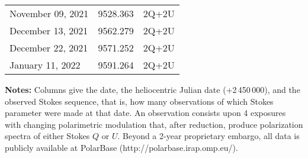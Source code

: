 \documentclass{/Users/art2/TeX/aanda/aa}
\begin{document}
\begin{appendix}
\begin{table} [t]
\begin{tabular}{lcl}
November 09, 2021 & 9528.363 & 2Q+2U \\

December 13, 2021 & 9562.279 & 2Q+2U \\

December 22, 2021 & 9571.252 & 2Q+2U \\

January 11, 2022 & 9591.264 & 2Q+2U \\
\hline
\end{tabular}
\label{tab1}

\textbf{Notes:} Columns give the date, the heliocentric Julian date (+2\,450\,000),  and the observed Stokes sequence, that is, how many observations of which Stokes parameter were made at that date. An observation consists upon 4 exposures with changing polarimetric modulation that, after reduction, produce polarization spectra of either Stokes $Q$ or $U$. Beyond a 2-year proprietary embargo, all data is publicly available at PolarBase (http://polarbase.irap.omp.eu/).

\end{table}

 
 
 
 
 

 
 \end{appendix}
\end{document}

